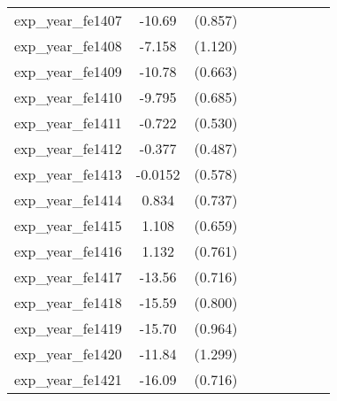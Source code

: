 {\begin{tabular}{l*{4}{cc}}
exp\_year\_fe1407&   -10.69\sym{***}&  (0.857)&                  &         &                  &         &                  &         \\
exp\_year\_fe1408&   -7.158\sym{***}&  (1.120)&                  &         &                  &         &                  &         \\
exp\_year\_fe1409&   -10.78\sym{***}&  (0.663)&                  &         &                  &         &                  &         \\
exp\_year\_fe1410&   -9.795\sym{***}&  (0.685)&                  &         &                  &         &                  &         \\
exp\_year\_fe1411&   -0.722         &  (0.530)&                  &         &                  &         &                  &         \\
exp\_year\_fe1412&   -0.377         &  (0.487)&                  &         &                  &         &                  &         \\
exp\_year\_fe1413&  -0.0152         &  (0.578)&                  &         &                  &         &                  &         \\
exp\_year\_fe1414&    0.834         &  (0.737)&                  &         &                  &         &                  &         \\
exp\_year\_fe1415&    1.108         &  (0.659)&                  &         &                  &         &                  &         \\
exp\_year\_fe1416&    1.132         &  (0.761)&                  &         &                  &         &                  &         \\
exp\_year\_fe1417&   -13.56\sym{***}&  (0.716)&                  &         &                  &         &                  &         \\
exp\_year\_fe1418&   -15.59\sym{***}&  (0.800)&                  &         &                  &         &                  &         \\
exp\_year\_fe1419&   -15.70\sym{***}&  (0.964)&                  &         &                  &         &                  &         \\
exp\_year\_fe1420&   -11.84\sym{***}&  (1.299)&                  &         &                  &         &                  &         \\
exp\_year\_fe1421&   -16.09\sym{***}&  (0.716)&                  &         &                  &         &                  &         \\

\end{tabular}}
